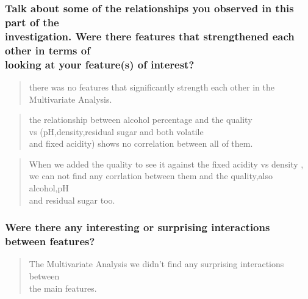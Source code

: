 \documentclass[]{article}
\begin{document}
\subsubsection{\texorpdfstring{Talk about some of the relationships you
observed in this part of the\\
investigation. Were there features that strengthened each other in terms
of\\
looking at your feature(s) of
interest?}{Talk about some of the relationships you observed in this part of the investigation. Were there features that strengthened each other in terms of looking at your feature(s) of interest?}}\label{talk-about-some-of-the-relationships-you-observed-in-this-part-of-the-investigation.-were-there-features-that-strengthened-each-other-in-terms-of-looking-at-your-features-of-interest}

\begin{quote}
there was no features that significantly strength each other in the\\
Multivariate Analysis.
\end{quote}

\begin{quote}
the relationship between alcohol percentage and the quality\\
vs (pH,density,residual sugar and both volatile\\
and fixed acidity) shows no correlation between all of them.\\
\end{quote}

\begin{quote}
When we added the quality to see it against the fixed acidity vs density
,\\
we can not find any corrlation between them and the quality,also
alcohol,pH\\
and residual sugar too.
\end{quote}

\subsubsection{Were there any interesting or surprising interactions
between
features?}\label{were-there-any-interesting-or-surprising-interactions-between-features}

\begin{quote}
The Multivariate Analysis we didn't find any surprising interactions
between\\
the main features.
\end{quote}
\end{document}
